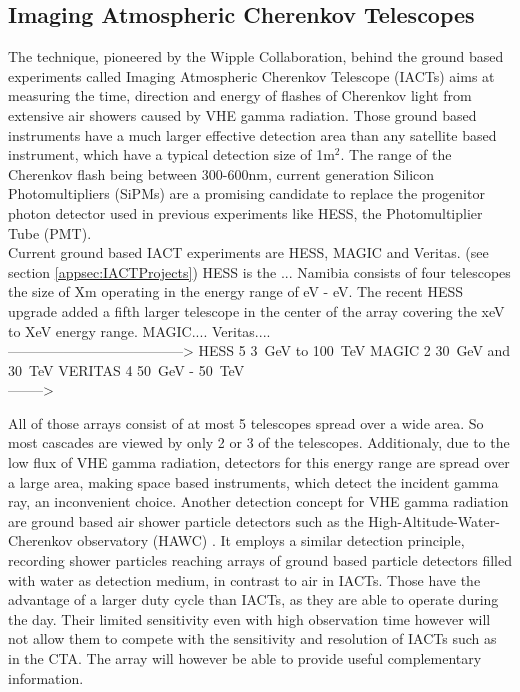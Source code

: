\documentclass[12pt,article,type=msc,colorback,accentcolor=tud9c]{tudthesis}
\begin{document}
\subsection{Imaging Atmospheric Cherenkov Telescopes}
The technique, pioneered by the Wipple Collaboration, behind the ground based experiments called Imaging Atmospheric Cherenkov Telescope (IACTs) aims at measuring the time, direction and energy of flashes of Cherenkov light from extensive air showers caused by VHE gamma radiation. Those ground based instruments have a much larger effective detection area than any satellite based instrument, which have a typical detection size of 1m$^2$. The range of the Cherenkov flash being between 300-600nm, current generation Silicon Photomultipliers (SiPMs) are a promising candidate to replace the progenitor photon detector used in previous experiments like HESS, the Photomultiplier Tube (PMT).\\
Current ground based IACT experiments are HESS, MAGIC and Veritas. (see section {\ref{appsec:IACTProjects}}) HESS is the ... Namibia consists of four telescopes the size of Xm operating in the energy range of eV - eV. The recent HESS upgrade added a fifth larger telescope in the center of the array covering the xeV to XeV energy range. MAGIC.... Veritas....\\




-------------------------------------->
HESS 5 3~GeV to 100~TeV
MAGIC 2   30~GeV and 30~TeV
VERITAS 4 50~GeV - 50~TeV\\

-------->

All of those arrays consist of at most 5 telescopes spread over a wide area. So most cascades are viewed by only 2 or 3 of the telescopes. Additionaly, due to the low flux of VHE gamma radiation, detectors for this energy range are spread over a large area, making space based instruments, which detect the incident gamma ray, an inconvenient choice. Another detection concept for VHE gamma radiation are ground based air shower particle detectors such as the High-Altitude-Water-Cherenkov observatory (HAWC) \cite{HAWC}. It employs a similar detection principle, recording shower particles reaching arrays of ground based particle detectors filled with water as detection medium, in contrast to air in IACTs. Those have the advantage of a larger duty cycle than IACTs, as they are able to operate during the day. Their limited sensitivity even with high observation time however will not allow them to compete with the sensitivity and resolution of IACTs such as in the CTA. The array will however be able to provide useful complementary information. 
\end{document}
